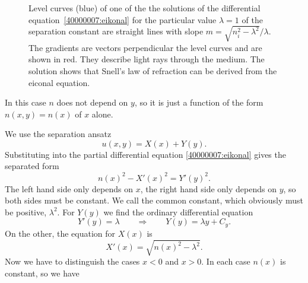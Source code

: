 \begin{loesung}
\begin{figure}
\centering
{}
\caption{Level curves (blue) of one of the the solutions of the
differential equation~\eqref{40000007:eikonal} for the particular
value $\lambda=1$ of the separation constant are straight lines with
slope $m=\sqrt{n_i^2-\lambda^2}/\lambda$.
The gradients are vectors perpendicular the level curves and are
shown in red.
They describe light rays through the medium.
The solution shows that Snell's law of refraction can be derived from
the eiconal equation.
\label{40000007:level}}
\end{figure}
In this case $n$ does not depend on $y$, so it is just a function
of the form $n(x,y)=n(x)$ of $x$ alone.
\begin{teilaufgaben}
\item
We use the separation ansatz
\[
u(x,y)=X(x) + Y(y).
\]
Substituting into the partial differential equation
\eqref{40000007:eikonal} gives the separated form
\[
n(x)^2-X'(x)^2=Y'(y)^2.
\]
The left hand side only depends on $x$, the right hand side only depends
on $y$, so both sides must be constant.
We call the common constant, which obviously must be positive, 
$\lambda^2$.
For 
$Y(y)$
we find the ordinary differential equation
\[
Y'(y)=\lambda \qquad\Rightarrow\qquad Y(y)=\lambda y+ C_y.
\]
On the other, the equation for $X(x)$ is
\[
X'(x)=\sqrt{n(x)^2-\lambda^2}.
\]
Now we have to distinguish the cases $x<0$ and $x>0$.
In each case $n(x)$ is constant, so we have

\end{teilaufgaben}
\end{loesung}
